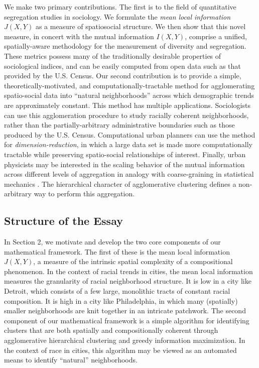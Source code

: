 	We make two primary contributions. The first is to the field of quantitative segregation studies in sociology. We formulate the \emph{mean local information} $J(X,Y)$ as a measure of spatiosocial structure. We then show that this novel measure, in concert with the mutual information $I(X,Y)$, comprise a unified, spatially-aware methodology for the measurement of diversity and segregation. These metrics possess many of the traditionally desirable properties of sociological indices, and can be easily computed from open data such as that provided by the U.S. Census. Our second contribution is to provide a simple, theoretically-motivated, and computationally-tractable method for agglomerating spatio-social data into ``natural neighborhoods'' across which demographic trends are approximately constant. This method has multiple applications. Sociologists can use this agglomeration procedure to study racially coherent neighborhoods, rather than the partially-arbitrary administrative boundaries such as those produced by the U.S. Census. Computational urban planners can use the method for \emph{dimension-reduction}, in which a large data set is made more computationally tractable while preserving spatio-social relationships of interest. Finally, urban physicists may be interested in the scaling behavior of the mutual information across different levels of aggregation in analogy with coarse-graining in statistical mechanics \cite{Bettencourt2015}. The hierarchical character of agglomerative clustering defines a non-arbitrary way to perform this aggregation. 

\subsection*{Structure of the Essay}
	In Section 2, we motivate and develop the two core components of our mathematical framework. The first of these is the mean local information $J(X,Y)$, a measure of the intrinsic spatial complexity of a compositional phenomenon. In the context of racial trends in cities, the mean local information measures the granularity of racial neighborhood structure. It is low in a city like Detroit, which consists of a few large, monolithic tracts of constant racial composition. It is high in a city like Philadelphia, in which many (spatially) smaller neighborhoods are knit together in an intricate patchwork. The second component of our mathematical framework is a simple algorithm for identifying clusters that are both spatially and compositionally coherent through agglomerative hierarchical clustering and greedy information maximization. In the context of race in cities, this algorithm may be viewed as an automated means to identify ``natural'' neighborhoods. 

